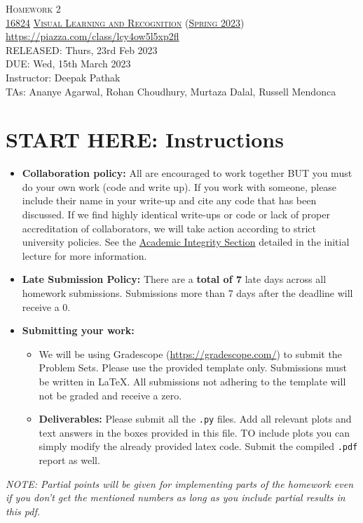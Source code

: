 \documentclass[11pt,addpoints,answers]{exam}
\title{\textsc{\hwName}} %
\author{}
\date{}
\date{}
\numberwithin{equation}{section} %
\numberwithin{figure}{section} %
\numberwithin{table}{section} %
\newcommand{\courseNum}{\href{https://visual-learning.cs.cmu.edu/}{16824}}
\newcommand{\courseName}{\href{https://visual-learning.cs.cmu.edu/}{Visual Learning and Recognition}}
\newcommand{\courseSem}{\href{https://visual-learning.cs.cmu.edu/}{Spring 2023}}
\newcommand{\courseUrl}{\url{https://piazza.com/class/lcy4ow5l5xp2fl}}
\newcommand{\hwNum}{Homework 2}
\newcommand{\hwTopic}{Generative Modelling}
\newcommand{\outDate}{Thurs, 23rd Feb 2023}
\newcommand{\dueDate}{Wed, 15th March 2023}
\newcommand{\instructorName}{Deepak Pathak}
\newcommand{\taNames}{Ananye Agarwal, Rohan Choudhury, Murtaza Dalal, Russell Mendonca}
\begin{document}
\section*{}
\begin{center}
  \textsc{\LARGE \hwNum} \\
  \vspace{1em}
  \textsc{\large \courseNum{} \courseName{} (\courseSem)} \\
  \courseUrl\\
  \vspace{1em}
  RELEASED: \outDate \\
  DUE: \dueDate \\
  Instructor: \instructorName \\
  TAs: \taNames
\end{center}

\section*{START HERE: Instructions}
\begin{itemize}
\item \textbf{Collaboration policy:} All are encouraged to work together BUT you must do your own work (code and write up). If you work with someone, please include their name in your write-up and cite any code that has been discussed. If we find highly identical write-ups or code or lack of proper accreditation of collaborators, we will take action according to strict university policies. See the \href{hhttps://www.cmu.edu/policies/student-and-student-life/academic-integrity.html}{Academic Integrity Section} detailed in the initial lecture for more information.

\item\textbf{Late Submission Policy:} There are a \textbf{total of 7} late days across all homework submissions. Submissions more than 7 days after the deadline will receive a 0.

\item\textbf{Submitting your work:}

\begin{itemize}

\item We will be using Gradescope (\url{https://gradescope.com/}) to submit the Problem Sets. Please use the provided template only. Submissions must be written in LaTeX. All submissions not adhering to the template will not be graded and receive a zero. 
\item \textbf{Deliverables:} Please submit all the \texttt{.py} files. Add all relevant plots and text answers in the boxes provided in this file. TO include plots you can simply modify the already provided latex code. Submit the compiled \texttt{.pdf} report as well.
\end{itemize}
\end{itemize}
\emph{NOTE: Partial points will be given for implementing parts of the homework even if you don't get the mentioned numbers as long as you include partial results in this pdf.}
\clearpage
\end{document}
